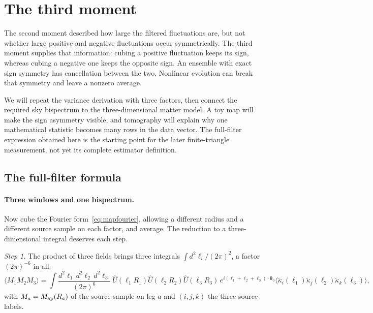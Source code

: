 \documentclass[11pt]{article}
\newcommand{\Map}{M_{\rm ap}}
\newcommand{\Uhat}{\widehat{U}}
\newcommand{\btheta}{\boldsymbol{\theta}}
\newcommand{\bell}{\boldsymbol{\ell}}
\numberwithin{equation}{section}
\begin{document}
\section{The third moment}
\label{sec:map3}

The second moment described how large the filtered fluctuations are, but
not whether large positive and negative fluctuations occur symmetrically.
The third moment supplies that information: cubing a positive fluctuation
keeps its sign, whereas cubing a negative one keeps the opposite sign.
An ensemble with exact sign symmetry has cancellation between the two.
Nonlinear evolution can break that symmetry and leave a nonzero average.

We will repeat the variance derivation with three factors, then connect
the required sky bispectrum to the three-dimensional matter model. A toy
map will make the sign asymmetry visible, and tomography will explain why
one mathematical statistic becomes many rows in the data vector. The
full-filter expression obtained here is the starting point for the later
finite-triangle measurement, not yet its complete estimator definition.

\subsection{The full-filter formula}
\label{sec:fullfilter}

\paragraph{Three windows and one bispectrum.}
Now cube the Fourier form~\eqref{eq:mapfourier}, allowing a different
radius and a different source sample on each factor, and average.
The reduction to a three-dimensional integral deserves each step.

\emph{Step 1.}  The product of three fields brings three integrals
$\int d^2\ell_i/(2\pi)^2$, a factor $(2\pi)^{-6}$ in all:
\begin{equation}
  \bigl\langle M_1 M_2 M_3 \bigr\rangle
  =
  \int \frac{d^2\ell_1\, d^2\ell_2\, d^2\ell_3}{(2\pi)^6}\;
  \Uhat(\ell_1 R_1) \Uhat(\ell_2 R_2) \Uhat(\ell_3 R_3)\,
  e^{i(\bell_1+\bell_2+\bell_3)\cdot\btheta_0}
  \bigl\langle \tilde\kappa_i(\bell_1) \tilde\kappa_j(\bell_2)
  \tilde\kappa_k(\bell_3) \bigr\rangle ,
  \label{eq:map3step1}
\end{equation}
with $M_a = \Map(R_a)$ of the source sample on leg $a$ and $(i,j,k)$
the three source labels.
\end{document}
